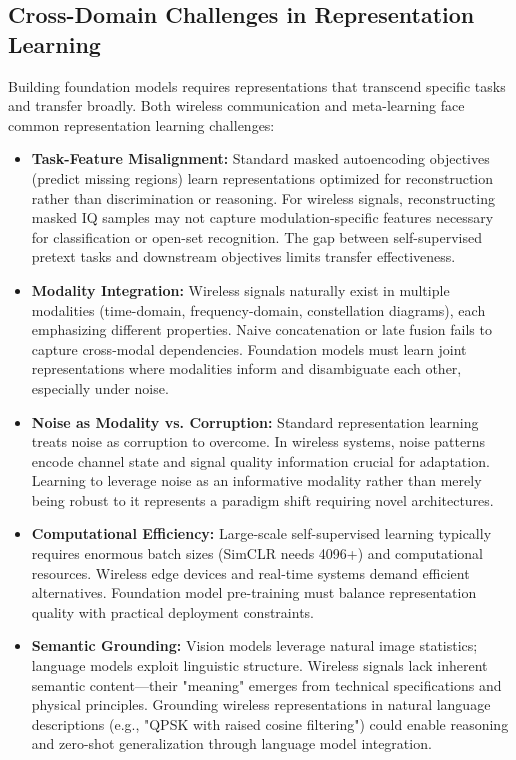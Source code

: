 \subsection{Cross-Domain Challenges in Representation Learning}

Building foundation models requires representations that transcend specific tasks and transfer broadly. Both wireless communication and meta-learning face common representation learning challenges:

\begin{itemize}
    \item \textbf{Task-Feature Misalignment:} Standard masked autoencoding objectives (predict missing regions) learn representations optimized for reconstruction rather than discrimination or reasoning\cite{}. For wireless signals, reconstructing masked IQ samples may not capture modulation-specific features necessary for classification or open-set recognition\cite{}. The gap between self-supervised pretext tasks and downstream objectives limits transfer effectiveness\cite{}.
    
    \item \textbf{Modality Integration:} Wireless signals naturally exist in multiple modalities (time-domain, frequency-domain, constellation diagrams)\cite{}, each emphasizing different properties. Naive concatenation or late fusion fails to capture cross-modal dependencies\cite{}. Foundation models must learn joint representations where modalities inform and disambiguate each other, especially under noise.
    
    \item \textbf{Noise as Modality vs. Corruption:} Standard representation learning treats noise as corruption to overcome\cite{}. In wireless systems, noise patterns encode channel state and signal quality information crucial for adaptation\cite{}. Learning to leverage noise as an informative modality rather than merely being robust to it represents a paradigm shift requiring novel architectures.
    
    \item \textbf{Computational Efficiency:} Large-scale self-supervised learning typically requires enormous batch sizes (SimCLR needs 4096+\cite{chen2020simple}) and computational resources\cite{}. Wireless edge devices and real-time systems demand efficient alternatives\cite{}. Foundation model pre-training must balance representation quality with practical deployment constraints.
    
    \item \textbf{Semantic Grounding:} Vision models leverage natural image statistics\cite{}; language models exploit linguistic structure\cite{}. Wireless signals lack inherent semantic content—their "meaning" emerges from technical specifications and physical principles\cite{}. Grounding wireless representations in natural language descriptions (e.g., "QPSK with raised cosine filtering") could enable reasoning and zero-shot generalization through language model integration.
    

\end{itemize}
